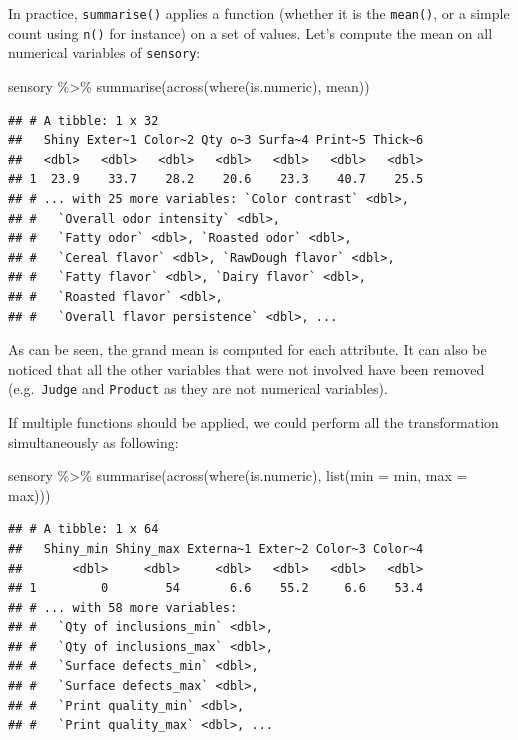 \documentclass[
]{krantz}
\makeatletter
\newenvironment{Shaded}{\begin{snugshade}}{\end{snugshade}}
\newcommand{\AttributeTok}[1]{\textcolor[rgb]{0.61,0.61,0.61}{#1}}
\newcommand{\FunctionTok}[1]{\textcolor[rgb]{0,0,0}{#1}}
\newcommand{\NormalTok}[1]{#1}
\newcommand{\SpecialCharTok}[1]{\textcolor[rgb]{0,0,0}{#1}}
\newenvironment{kframe}{%
\medskip{}
\setlength{\fboxsep}{.8em}
 \def\at@end@of@kframe{}%
 \ifinner\ifhmode%
  \def\at@end@of@kframe{\end{minipage}}%
  \begin{minipage}{\columnwidth}%
 \fi\fi%
 \def\FrameCommand##1{\hskip\@totalleftmargin \hskip-\fboxsep
 \colorbox{shadecolor}{##1}\hskip-\fboxsep
     \hskip-\linewidth \hskip-\@totalleftmargin \hskip\columnwidth}%
 \MakeFramed {\advance\hsize-\width
   \@totalleftmargin\z@ \linewidth\hsize
   \@setminipage}}%
 {\par\unskip\endMakeFramed%
 \at@end@of@kframe}
\renewenvironment{Shaded}{\begin{kframe}}{\end{kframe}}
\makeatother
\begin{document}
In practice, \texttt{summarise()} applies a function (whether it is the \texttt{mean()}, or a simple count using \texttt{n()} for instance) on a set of values. Let's compute the mean on all numerical variables of \texttt{sensory}:

\begin{Shaded}
\begin{Highlighting}[]
\NormalTok{sensory }\SpecialCharTok{\%\textgreater{}\%}
  \FunctionTok{summarise}\NormalTok{(}\FunctionTok{across}\NormalTok{(}\FunctionTok{where}\NormalTok{(is.numeric), mean))}
\end{Highlighting}
\end{Shaded}

\begin{verbatim}
## # A tibble: 1 x 32
##   Shiny Exter~1 Color~2 Qty o~3 Surfa~4 Print~5 Thick~6
##   <dbl>   <dbl>   <dbl>   <dbl>   <dbl>   <dbl>   <dbl>
## 1  23.9    33.7    28.2    20.6    23.3    40.7    25.5
## # ... with 25 more variables: `Color contrast` <dbl>,
## #   `Overall odor intensity` <dbl>,
## #   `Fatty odor` <dbl>, `Roasted odor` <dbl>,
## #   `Cereal flavor` <dbl>, `RawDough flavor` <dbl>,
## #   `Fatty flavor` <dbl>, `Dairy flavor` <dbl>,
## #   `Roasted flavor` <dbl>,
## #   `Overall flavor persistence` <dbl>, ...
\end{verbatim}

As can be seen, the grand mean is computed for each attribute. It can also be noticed that all the other variables that were not involved have been removed (e.g.~\texttt{Judge} and \texttt{Product} as they are not numerical variables).

If multiple functions should be applied, we could perform all the transformation simultaneously as following:

\begin{Shaded}
\begin{Highlighting}[]
\NormalTok{sensory }\SpecialCharTok{\%\textgreater{}\%}
  \FunctionTok{summarise}\NormalTok{(}\FunctionTok{across}\NormalTok{(}\FunctionTok{where}\NormalTok{(is.numeric), }\FunctionTok{list}\NormalTok{(}\AttributeTok{min =}\NormalTok{ min, }\AttributeTok{max =}\NormalTok{ max)))}
\end{Highlighting}
\end{Shaded}

\begin{verbatim}
## # A tibble: 1 x 64
##   Shiny_min Shiny_max Externa~1 Exter~2 Color~3 Color~4
##       <dbl>     <dbl>     <dbl>   <dbl>   <dbl>   <dbl>
## 1         0        54       6.6    55.2     6.6    53.4
## # ... with 58 more variables:
## #   `Qty of inclusions_min` <dbl>,
## #   `Qty of inclusions_max` <dbl>,
## #   `Surface defects_min` <dbl>,
## #   `Surface defects_max` <dbl>,
## #   `Print quality_min` <dbl>,
## #   `Print quality_max` <dbl>, ...
\end{verbatim}
\end{document}
